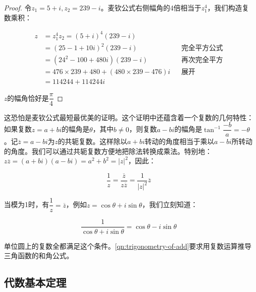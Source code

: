 \documentclass[b5paper]{ctexart}
\begin{document}
\begin{proof}
令$z_1 = 5 + i, z_2 = 239 - i$。麦钦公式右侧幅角的4倍相当于$z_1^4$，我们构造复数乘积：

\begin{align*}
z &= z_1^4z_2 = (5+i)^4(239-i) \\
  &= (25 - 1 + 10i)^2(239 - i) && \text{完全平方公式} \\
  &= (24^2 - 100 + 480i)(239 - i) && \text{再次完全平方} \\
  &= 476 \times 239 + 480 + (480 \times 239 - 476)i && \text{展开} \\
  &= 114244 + 114244i
\end{align*}

$z$的幅角恰好是$\dfrac{\pi}{4}$
\end{proof}

这恐怕是麦钦公式最短最优美的证明。这个证明中还蕴含着一个复数的几何特性：如果复数$z = a + bi$的幅角是$\theta$，其中$b \ne 0$，则复数$a - bi$的幅角是$\tan^{-1}\dfrac{-b}{a} = -\theta$。记$\overline{z} = a - bi$为$z$的共轭复数。这样除以$a + bi$转动的角度相当于乘以$a - bi$所转动的角度。我们可以通过共轭复数方便地把除法转换成乘法。特别地：$z\overline{z} = (a + bi)(a - bi) = a^2 + b^2 = |z|^2$，因此：

\[
\frac{1}{z} = \frac{\overline{z}}{z\overline{z}} = \frac{1}{|z|^2}\overline{z}
\]

当模为1时，有$\dfrac{1}{z} = \overline{z}$，例如$z = \cos\theta + i\sin\theta$，我们立刻知道：

\[
\frac{1}{\cos\theta + i\sin\theta} = \cos\theta - i\sin\theta
\]

单位圆上的复数全都满足这个条件。\cref{qn:trigonometry-of-add}要求用复数运算推导三角函数的和角公式。

\subsection{代数基本定理}
\end{document}
